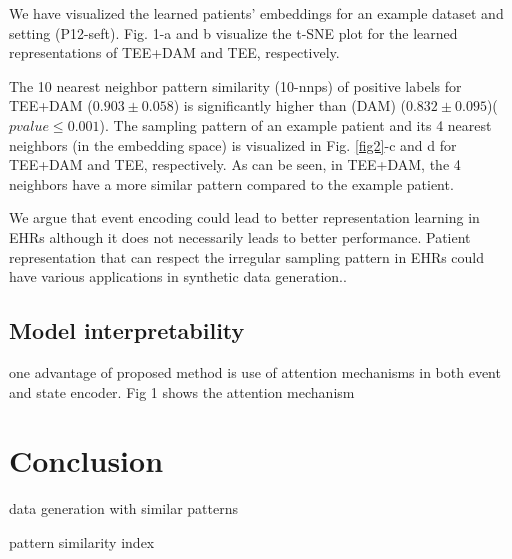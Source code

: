 \documentclass[journal,twoside,web]{ieeecolor}
\begin{document}
We have visualized the learned patients' embeddings for an example dataset and setting (P12-seft). Fig. 1-a and b visualize the t-SNE plot for the learned representations of TEE+DAM and TEE, respectively. 

The 10 nearest neighbor pattern similarity (10-nnps) of positive labels for TEE+DAM ($0.903 \pm 0.058 $) is significantly higher than (DAM) ($0.832 \pm 0.095$)($pvalue \leq 0.001$). The sampling pattern of an example patient and its 4 nearest neighbors (in the embedding space) is visualized in Fig. \ref*{fig2}-c and d for TEE+DAM and TEE, respectively. As can be seen, in TEE+DAM, the 4 neighbors have a more similar pattern compared to the example patient. 

We argue that event encoding could lead to better representation learning in EHRs although it does not necessarily leads to better performance. Patient representation that can respect the irregular sampling pattern in EHRs could have various applications in synthetic data generation..



\subsection{Model interpretability}


one advantage of proposed method is use of attention mechanisms in both event and state encoder.
Fig 1 shows the attention mechanism





\section{Conclusion}
\label{sec:Conclusion}

data generation with similar patterns

pattern similarity index









\end{document}

